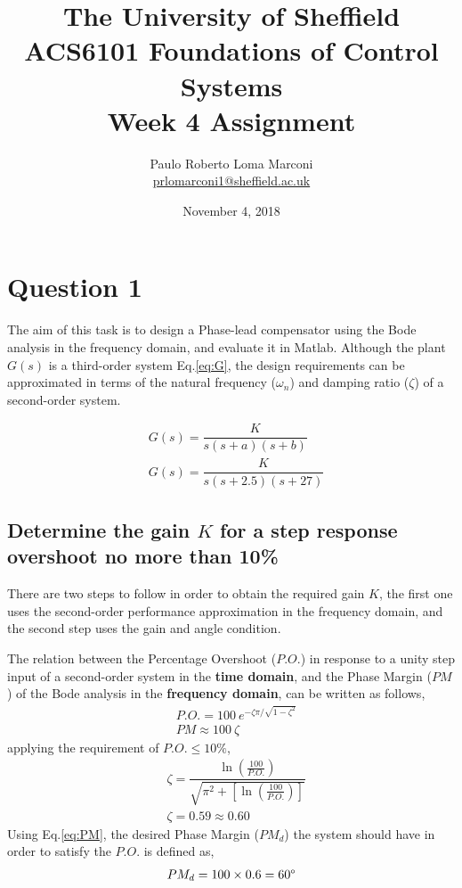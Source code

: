 \documentclass[11pt, a4paper]{article}
\title{The University of Sheffield\\
	ACS6101 Foundations of Control Systems\\ 
	Week 4 Assignment}
\author{Paulo Roberto Loma Marconi\\ \url{prlomarconi1@sheffield.ac.uk}}
\date{November 4, 2018}
\begin{document}
\maketitle

\section{Question 1}
The aim of this task is to design a Phase-lead compensator using the Bode analysis in the frequency domain, and evaluate it in Matlab. Although the plant $G(s)$ is a third-order system Eq.\eqref{eq:G}, the design requirements can be approximated in terms of the natural frequency ($\omega_n$) and damping ratio ($\zeta$) of a second-order system.

\begin{align}
& G(s)=\dfrac{K}{s(s+a)(s+b)} \label{eq:G}\\
& G(s)=\dfrac{K}{s(s+2.5)(s+27)} \nonumber
\end{align} 

\subsection{Determine the gain $K$ for a step response overshoot no more than 10\%}
There are two steps to follow in order to obtain the required gain $K$, the first one uses the second-order performance approximation in the frequency domain, and the second step uses the gain and angle condition.

The relation between the Percentage Overshoot ($P.O.$) in response to a unity step input of a second-order system in the \textbf{time domain}, and the Phase Margin ($PM$) of the Bode analysis in the \textbf{frequency domain}, can be written as follows,
\begin{align}
& P.O. = 100~e^{-\zeta\pi/\sqrt{1-\zeta^2}} \label{PO} \\
& PM  \approx 100 ~\zeta \label{eq:PM}
\end{align}
applying the requirement of $P.O.\leq10\%$,
\begin{align}
& \zeta = \dfrac{ \ln\left(\frac{100}{P.O.}\right) }{\sqrt{\pi^2+\left[ \ln \left(  \frac{100}{P.O.}\right)\right]}}	\label{eq:zeta} \\
& \zeta = 0.59 \approx 0.60 \nonumber
\end{align}
Using Eq.\eqref{eq:PM}, the desired Phase Margin ($PM_d$) the system should have in order to satisfy the $P.O.$ is defined as,
\begin{align*}
PM_d = 100\times 0.6 = 60\degree
\end{align*}
\end{document}
